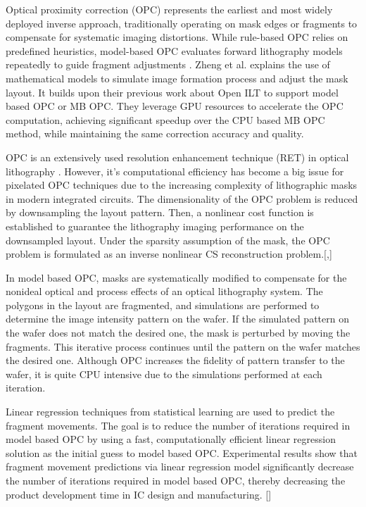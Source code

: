 \documentclass[pdflatex,sn-mathphys-num]{sn-jnl}%
\theoremstyle{thmstyleone}%
\theoremstyle{thmstyletwo}%
\theoremstyle{thmstylethree}%
\begin{document}
Optical proximity correction (OPC) represents the earliest and most widely deployed inverse approach, traditionally operating on mask edges or fragments to compensate for systematic imaging distortions. While rule-based OPC relies on predefined heuristics, model-based OPC evaluates forward lithography models repeatedly to guide fragment adjustments \cite{capodieci2006optical}. Zheng et al. \cite{Zheng2024} explains the use of mathematical models to simulate image formation process and adjust the mask layout. It builds upon their previous work \cite{Zheng2023} about Open ILT to support model based OPC or MB OPC. They leverage GPU resources to accelerate the OPC computation, achieving significant speedup over the CPU based MB OPC method, while maintaining the same correction accuracy and quality.

OPC is an extensively used resolution enhancement technique (RET) in optical lithography . However, it's  computational efficiency has become a big issue for pixelated OPC techniques due to the increasing complexity of lithographic masks in modern integrated circuits. The dimensionality of the OPC problem is reduced by  downsampling the layout pattern. Then, a nonlinear cost function is established to guarantee the lithography imaging performance on the downsampled layout. 
Under the sparsity assumption of the mask, the OPC problem is formulated as an inverse nonlinear CS reconstruction problem.[\cite{ma2018fast},\cite{capodieci2006optical}]

In model  based OPC, masks are systematically modified to compensate for the nonideal optical and process effects of an optical lithography system. The polygons in the layout are fragmented, and simulations are performed to determine the image intensity pattern on the wafer. If the simulated pattern on the wafer does not match the desired one, the mask is perturbed by moving the fragments. This iterative process continues until the pattern on the wafer matches the desired one. Although OPC increases the fidelity of pattern transfer to the wafer, it is quite CPU intensive due to the simulations performed at each iteration. 

Linear regression techniques from statistical learning are used to predict the fragment movements. The goal is to reduce the number of iterations required in model based OPC by using a fast, computationally efficient linear regression solution as the initial guess to model based OPC. Experimental results show that fragment movement predictions via linear regression model significantly decrease the number of iterations required in model based OPC, thereby decreasing the product development time in IC design and manufacturing. [\cite{Gu2008}]
\end{document}

